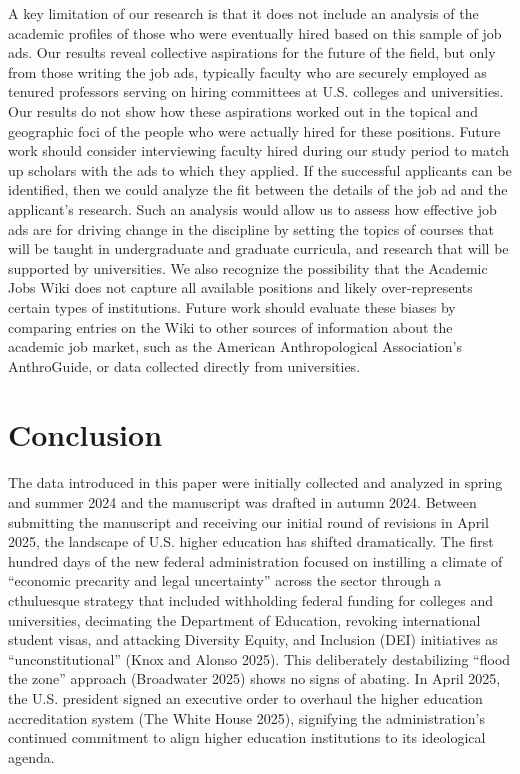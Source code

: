\documentclass[
  12pt,
]{article}
\begin{document}
A key limitation of our research is that it does not include an analysis
of the academic profiles of those who were eventually hired based on
this sample of job ads. Our results reveal collective aspirations for
the future of the field, but only from those writing the job ads,
typically faculty who are securely employed as tenured professors
serving on hiring committees at U.S. colleges and universities. Our
results do not show how these aspirations worked out in the topical and
geographic foci of the people who were actually hired for these
positions. Future work should consider interviewing faculty hired during
our study period to match up scholars with the ads to which they
applied. If the successful applicants can be identified, then we could
analyze the fit between the details of the job ad and the applicant's
research. Such an analysis would allow us to assess how effective job
ads are for driving change in the discipline by setting the topics of
courses that will be taught in undergraduate and graduate curricula, and
research that will be supported by universities. We also recognize the
possibility that the Academic Jobs Wiki does not capture all available
positions and likely over-represents certain types of institutions.
Future work should evaluate these biases by comparing entries on the
Wiki to other sources of information about the academic job market, such
as the American Anthropological Association's AnthroGuide, or data
collected directly from universities.

\section{Conclusion}\label{conclusion}

The data introduced in this paper were initially collected and analyzed
in spring and summer 2024 and the manuscript was drafted in autumn 2024.
Between submitting the manuscript and receiving our initial round of
revisions in April 2025, the landscape of U.S. higher education has
shifted dramatically. The first hundred days of the new federal
administration focused on instilling a climate of ``economic precarity
and legal uncertainty'' across the sector through a cthuluesque strategy
that included withholding federal funding for colleges and universities,
decimating the Department of Education, revoking international student
visas, and attacking Diversity Equity, and Inclusion (DEI) initiatives
as ``unconstitutional'' (Knox and Alonso 2025). This deliberately
destabilizing ``flood the zone'' approach (Broadwater 2025) shows no
signs of abating. In April 2025, the U.S. president signed an executive
order to overhaul the higher education accreditation system (The White
House 2025), signifying the administration's continued commitment to
align higher education institutions to its ideological agenda.
\end{document}

